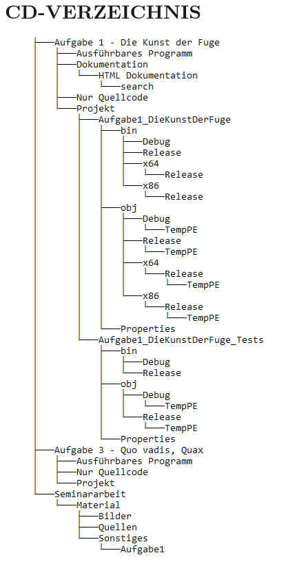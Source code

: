\documentclass[a4paper,12pt]{article}
\begin{document}

\newpage
\section{CD-VERZEICHNIS}

\begin{figure}[H]
    \includegraphics[width=.7\linewidth]{Bilder/Sonstiges/CDVerzeichnis.png}
\end{figure}

\end{document}
